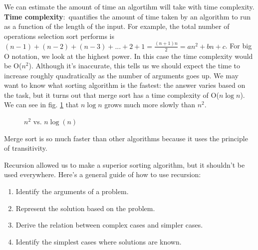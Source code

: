 \documentclass[nobib]{tufte-handout}
\newcommand{\defn}[2]{\noindent\textbf{#1}:\ #2}
\begin{document}
We can estimate the amount of time an algortihm will take 
with time complexity. 
\defn{Time complexity}{quantifies the amount of time taken 
by an algorithm to run as a function of the length of the input}.
For example, the total number of operations selection sort 
performs is $(n-1) + (n-2) + (n-3) + ... + 2 + 1 = \frac{(n+1)n}{2} = 
an^2+bn+c$. For big O notation, we look at the highest power. In this 
case the time complexity would be O($n^2$). Although it's inaccurate, 
this tells us we should expect the time to increase roughly quadratically 
as the number of arguments goes up. We may want to know what sorting algorithm 
is the fastest: the answer varies based on the task, but it turns out 
that merge sort has a time complexity of O($n \log{n}$). We can see in fig. 
\ref{fig:tc} that $n \log{n}$ grows much more slowly than $n^2$. 
\begin{figure}
   \caption{$n^2$ vs. $n\log(n)$}
   \label{fig:tc}
\end{figure}
Merge sort is so much faster than other algorithms because it uses the principle of 
transitivity. 

Recursion allowed us to make a superior sorting algorithm, but it shouldn't 
be used everywhere. Here's a general guide of how to use recursion:
\begin{enumerate}
   \item Identify the arguments of a problem. 
   \item Represent the solution based on the problem. 
   \item Derive the relation between complex cases and simpler cases. 
   \item Identify the simplest cases where solutions are known.
\end{enumerate}
\end{document}
